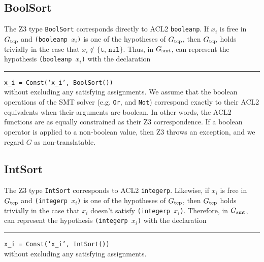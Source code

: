 \subsection{BoolSort}\label{subsec:bools}
The Z3 type \texttt{BoolSort} corresponds directly to ACL2 \texttt{booleanp}.
If $x_i$ is free in $G_{\mathrm{tcp}}$ and \texttt{(booleanp $x_i$)} is one of the
hypotheses of $G_{\mathrm{tcp}}$, then $G_{\mathrm{tcp}}$ holds trivially in the case that $x_i
\not\in \{\texttt{t},\,\texttt{nil}\}$.  Thus, in $G_{\mathrm{smt}}$, \smtlink{} can
represent the hypothesis \texttt{(booleanp $x_i$)} with the declaration\\
\rule{2em}{0ex}\texttt{x\_i = Const('x\_i', BoolSort())}\\
without excluding any satisfying assignments.
We assume that the boolean operations of the \acs{SMT} solver (e.g. \texttt{Or},
and \texttt{Not}) correspond exactly to their ACL2 equivalents when their
arguments are boolean. In other words, the ACL2 functions are as equally
constrained as their Z3 correspondence.
If a boolean operator is applied to a non-boolean value, then Z3 throws an
exception, and we regard $G$ as non-translatable.

\subsection{IntSort}\label{subsec:ints}
The Z3 type \texttt{IntSort} corresponds to ACL2 \texttt{integerp}.
Likewise, if $x_i$ is free in $G_{\mathrm{tcp}}$ and \texttt{(integerp $x_i$)} is one of
the hypotheses of $G_{\mathrm{tcp}}$, then $G_{\mathrm{tcp}}$ holds trivially in the case that $x_i$
doesn't satisfy \texttt{(integerp $x_i$)}. Therefore, in $G_{\mathrm{smt}}$, \smtlink{} can
represent the hypothesis \texttt{(integerp $x_i$)} with the declaration\\
\rule{2em}{0ex}\texttt{x\_i = Const('x\_i', IntSort())}\\
without excluding any satisfying assignments.

